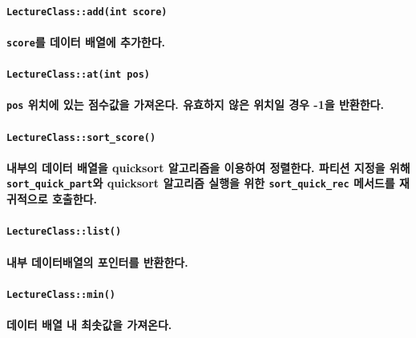 \documentclass[UTF8]{report}
\begin{document}
            \paragraph{\texttt{LectureClass::add(int score)}}
            \paragraph{%
                \normalfont \texttt{score}를 데이터 배열에 추가한다.
            }

            \paragraph{\texttt{LectureClass::at(int pos)}}
            \paragraph{%
                \normalfont \texttt{pos} 위치에 있는 점수값을 가져온다. 유효하지 않은 위치일 경우 -1을 반환한다.
            }

            \paragraph{\texttt{LectureClass::sort\_score()}}
            \paragraph{%
                \normalfont 내부의 데이터 배열을 quicksort 알고리즘을 이용하여 정렬한다. 파티션 지정을 위해 \texttt{sort\_quick\_part}와 quicksort 알고리즘 실행을 위한 \texttt{sort\_quick\_rec} 메서드를 재귀적으로 호출한다.
            }

            \paragraph{\texttt{LectureClass::list()}}
            \paragraph{%
                \normalfont 내부 데이터배열의 포인터를 반환한다.
            }

            \paragraph{\texttt{LectureClass::min()}}
            \paragraph{%
                \normalfont 데이터 배열 내 최솟값을 가져온다.
            }
\end{document}
